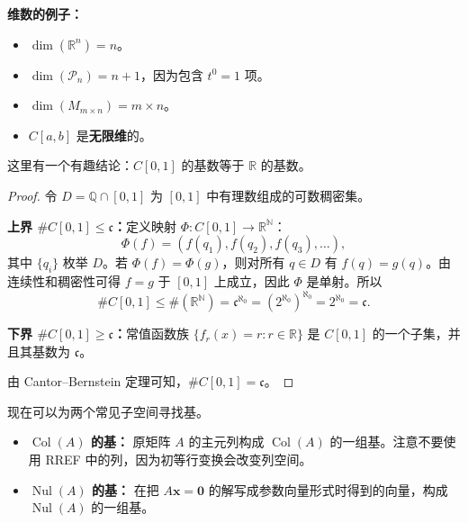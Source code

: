 \textbf{维数的例子：}
\begin{itemize}
    \item $\dim(\mathbb{R}^n)=n$。
    \item $\dim(\mathcal{P}_n)=n+1$，因为包含 $t^0=1$ 项。
    \item $\dim(M_{m\times n})=m\times n$。
    \item $C[a,b]$ 是\textbf{无限维}的。
\end{itemize}

这里有一个有趣结论：$C[0,1]$ 的基数等于 $\mathbb{R}$ 的基数。

\begin{proof}
令 $D=\mathbb{Q}\cap[0,1]$ 为 $[0,1]$ 中有理数组成的可数稠密集。

\textbf{上界 $\#C[0,1]\leq\mathfrak{c}$：}定义映射 $\Phi:C[0,1]\to\mathbb{R}^{\mathbb{N}}$：
\[
\Phi(f)=(f(q_1),f(q_2),f(q_3),\dots),
\]
其中 $\{q_i\}$ 枚举 $D$。若 $\Phi(f)=\Phi(g)$，则对所有 $q\in D$ 有 $f(q)=g(q)$。由连续性和稠密性可得 $f=g$ 于 $[0,1]$ 上成立，因此 $\Phi$ 是单射。所以
\[
\#C[0,1]\leq \#(\mathbb{R}^{\mathbb{N}})=\mathfrak{c}^{\aleph_0}=(2^{\aleph_0})^{\aleph_0}=2^{\aleph_0}=\mathfrak{c}.
\]

\textbf{下界 $\#C[0,1]\geq\mathfrak{c}$：}常值函数族 $\{f_r(x)=r:r\in\mathbb{R}\}$ 是 $C[0,1]$ 的一个子集，并且其基数为 $\mathfrak{c}$。

由 Cantor--Bernstein 定理可知，$\#C[0,1]=\mathfrak{c}$。
\end{proof}

现在可以为两个常见子空间寻找基。
\begin{itemize}
    \item \textbf{$\operatorname{Col}(A)$ 的基：}
    原矩阵 $A$ 的主元列构成 $\operatorname{Col}(A)$ 的一组基。注意不要使用 RREF 中的列，因为初等行变换会改变列空间。
    \item \textbf{$\operatorname{Nul}(A)$ 的基：}
    在把 $A\mathbf{x}=\mathbf{0}$ 的解写成参数向量形式时得到的向量，构成 $\operatorname{Nul}(A)$ 的一组基。
\end{itemize}

